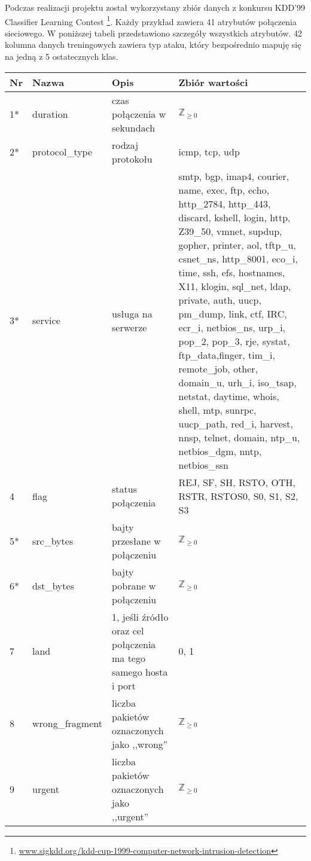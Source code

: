 \documentclass[a4paper, 12pt]{article}
\begin{document}
Podczas realizacji projektu został wykorzystany zbiór danych z konkursu 
KDD'99 Classifier Learning Contest
\footnote{\url{www.sigkdd.org/kdd-cup-1999-computer-network-intrusion-detection}}.
Każdy przykład zawiera 41 atrybutów połączenia sieciowego. W poniższej tabeli przedstawiono
szczegóły wszystkich atrybutów.
42 kolumna danych treningowych zawiera typ ataku, który bezpośrednio mapuję się na
jedną z 5 ostatecznych klas. \\

\begin{tabular}{ | l | p{3cm} | p{3cm} | p{6cm} | } \hline
Nr & Nazwa & Opis & Zbiór wartości \\ \hline
1*      & duration & czas połączenia w sekundach & $\mathbb Z_{\ge 0}$ \\ \hline
2*      & protocol\_type & rodzaj protokołu & icmp, tcp, udp \\ \hline
3*      & service & usługa na serwerze & smtp, bgp, imap4, courier, name, exec, ftp, echo, http\_2784,
                       http\_443, discard, kshell, login, http, Z39\_50, vmnet, supdup,
                       gopher, printer, aol, tftp\_u, csnet\_ns, http\_8001, eco\_i, time,
                       ssh, efs, hostnames, X11, klogin, sql\_net, ldap, private,
                       auth, uucp, pm\_dump, link, ctf, IRC, ecr\_i, netbios\_ns, urp\_i,
                       pop\_2, pop\_3, rje, systat, ftp\_data,finger, tim\_i, remote\_job,
                       other, domain\_u, urh\_i, iso\_tsap, netstat, daytime, whois, shell,
                       mtp, sunrpc, uucp\_path, red\_i, harvest, nnsp, telnet, domain,
                       ntp\_u, netbios\_dgm, nntp, netbios\_ssn \\ \hline
4      & flag & status połączenia & REJ, SF, SH, RSTO, OTH, RSTR, RSTOS0, S0, S1, S2, S3 \\ \hline
5*      & src\_bytes  & bajty przesłane w połączeniu & $\mathbb Z_{\ge 0}$ \\ \hline
6*      & dst\_bytes  & bajty pobrane w połączeniu  & $\mathbb Z_{\ge 0}$ \\ \hline
7      & land & 1, jeśli źródło oraz cel połączenia ma tego samego hosta i port & 0, 1 \\ \hline
8      & wrong\_fragment  & liczba pakietów oznaczonych jako ,,wrong'' & $\mathbb Z_{\ge 0}$ \\ \hline
9      & urgent  & liczba pakietów oznaczonych jako ,,urgent''  & $\mathbb Z_{\ge 0}$ \\ \hline
\end{tabular}
\end{document}
